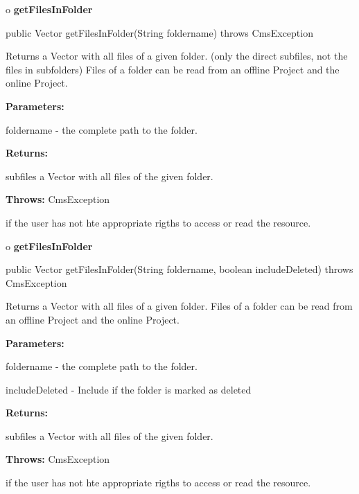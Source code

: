 o {\bf getFilesInFolder} 

\begin{PRE}
 public Vector getFilesInFolder(String foldername) throws CmsException
\end{PRE}

\begin{description}
\htmlDD Returns a Vector with all files of a given folder. (only the direct
subfiles, not the files in subfolders) \htmlBR
Files of a folder can be read from an offline Project and the online Project. 

\begin{description}
\item {\bf Parameters:}  

foldername - the complete path to the folder.  
\item {\bf Returns:}  

subfiles a Vector with all files of the given folder.  
\item {\bf Throws:} CmsException  

if the user has not hte appropriate rigths to access or read the resource.  
\end{description}

\end{description}

o {\bf getFilesInFolder} 

\begin{PRE}
 public Vector getFilesInFolder(String foldername,
                                boolean includeDeleted) throws CmsException
\end{PRE}

\begin{description}
\htmlDD Returns a Vector with all files of a given folder. \htmlBR
Files of a folder can be read from an offline Project and the online Project. 

\begin{description}
\item {\bf Parameters:}  

foldername - the complete path to the folder.  

includeDeleted - Include if the folder is marked as deleted  
\item {\bf Returns:}  

subfiles a Vector with all files of the given folder.  
\item {\bf Throws:} CmsException  

if the user has not hte appropriate rigths to access or read the resource.  
\end{description}

\end{description}

